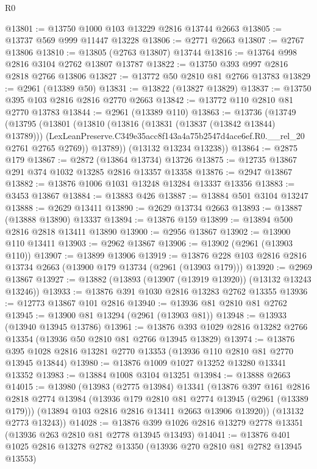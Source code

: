 \begin{lexlean}{R0}
\begin{coremodule}
@13801 := @13750 @1000 @103 @13229 @2816 @13744 @2663
@13805 := @13737 @569 @999 @11447 @13228
@13806 := @2771 @2663
@13807 := @2767 @13806
@13810 := @13805 (@2763 @13807) @13744
@13816 := @13764 @998 @2816 @3104 @2762 @13807 @13787
@13822 := @13750 @393 @997 @2816 @2818 @2766 @13806
@13827 := @13772 @50 @2810 @81 @2766 @13783
@13829 := @2961 (@13389 @50)
@13831 := @13822 (@13827 @13829)
@13837 := @13750 @395 @103 @2816 @2816 @2770 @2663
@13842 := @13772 @110 @2810 @81 @2770 @13783
@13844 := @2961 (@13389 @110)
@13863 := @13736
    (@13749
      (@13795
        (@13801
          (@13810
            (@13816 (@13831 (@13837 (@13842 @13844) @13789)))
            (LexLeanPreserve.C349e35acc8f143a4a75b2547d4ace6ef.R0.__rel_20 @2761 @2765 @2769))
          @13789))
      (@13132 @13234 @13238))
@13864 := @2875 @179
@13867 := @2872 (@13864 @13734) @13726
@13875 := @12735 @13867 @291 @374 @1032 @13285 @2816 @13357 @13358
@13876 := @2947 @13867
@13882 := @13876 @1006 @1031 @13248 @13284 @13337 @13356
@13883 := @3453 @13867
@13884 := @13883 @426
@13887 := @13884 @501 @3104 @13247
@13888 := @2629 @13411
@13890 := @2629 @13734 @2663
@13893 := @13887 (@13888 @13890) @13337
@13894 := @13876 @159
@13899 := @13894 @500 @2816 @2818 @13411 @13890
@13900 := @2956 @13867
@13902 := @13900 @110 @13411
@13903 := @2962 @13867
@13906 := @13902 (@2961 (@13903 @110))
@13907 := @13899 @13906
@13919 := @13876 @228 @103 @2816 @2816 @13734 @2663 (@13900 @179 @13734 (@2961 (@13903 @179)))
@13920 := @2969 @13867
@13927 := @13882 (@13893 (@13907 (@13919 @13920)) (@13132 @13243 @13246))
@13933 := @13876 @391 @1030 @2816 @13283 @2762 @13355
@13936 := @12773 @13867 @101 @2816
@13940 := @13936 @81 @2810 @81 @2762
@13945 := @13900 @81 @13294 (@2961 (@13903 @81))
@13948 := @13933 (@13940 @13945 @13786)
@13961 := @13876 @393 @1029 @2816 @13282 @2766 @13354 (@13936 @50 @2810 @81 @2766 @13945 @13829)
@13974 := @13876 @395 @1028 @2816 @13281 @2770 @13353 (@13936 @110 @2810 @81 @2770 @13945 @13844)
@13980 := @13876 @1009 @1027 @13252 @13280 @13341 @13352
@13983 := @13884 @1008 @3104 @13251
@13984 := @13888 @2663
@14015 := @13980
    (@13983
      (@2775 @13984)
      @13341
      (@13876
        @397
        @161
        @2816
        @2818
        @2774
        @13984
        (@13936 @179 @2810 @81 @2774 @13945 (@2961 (@13389 @179)))
        (@13894 @103 @2816 @2816 @13411 @2663 @13906 @13920))
      (@13132 @2773 @13243))
@14028 := @13876 @399 @1026 @2816 @13279 @2778 @13351 (@13936 @263 @2810 @81 @2778 @13945 @13493)
@14041 := @13876 @401 @1025 @2816 @13278 @2782 @13350 (@13936 @270 @2810 @81 @2782 @13945 @13553)

\end{coremodule}
\end{lexlean}
